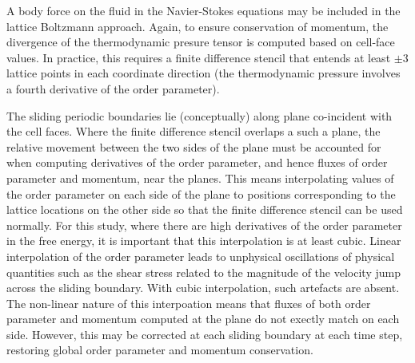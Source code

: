 \documentclass[8.5pt,twoside,twocolumn]{article}
\begin{document}
A body force on the fluid in the Navier-Stokes equations may be
included in the lattice Boltzmann approach. Again, to ensure conservation
of momentum, the divergence of the thermodynamic presure tensor is
computed based on cell-face values. In practice, this requires a
finite difference stencil
that entends at least $\pm 3$ lattice points in each coordinate direction
(the thermodynamic pressure involves a fourth derivative of the order
parameter).

The sliding periodic boundaries lie (conceptually) along plane
co-incident with the cell faces. Where the finite difference stencil 
overlaps a such a plane, the relative movement between the two sides
of the plane must be accounted for when computing derivatives of the
order parameter, and hence fluxes of order parameter and momentum,
near the planes. This means interpolating values of the order parameter
on each side of the plane to positions corresponding to the lattice
locations on the other side so that the finite difference stencil
can be used normally. For this study, where there are high derivatives
of the order parameter in the free energy, it is important that this
interpolation is at least cubic. Linear interpolation of the order
parameter leads to unphysical oscillations of physical quantities
such as the shear stress related to the magnitude of the velocity jump
across the sliding boundary.
With cubic interpolation, such artefacts are absent. The non-linear
nature of this interpoation means that fluxes of both order parameter
and momentum computed at the plane do not exectly match on each side.
However, this may be corrected at each sliding boundary at each time
step, restoring global order parameter and momentum conservation.



\footnotesize{
}
\end{document}
